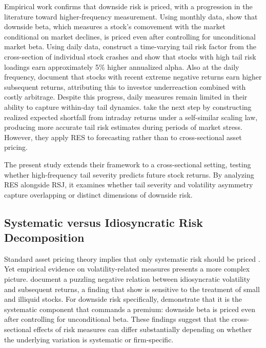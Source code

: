 \documentclass[11pt,a4paper]{article}
\begin{document}
Empirical work confirms that downside risk is priced, with a progression in the literature toward higher-frequency measurement. Using monthly data, \citet{ang2006downside} show that downside beta, which measures a stock's comovement with the market conditional on market declines, is priced even after controlling for unconditional market beta. Using daily data, \citet{kelly2014} construct a time-varying tail risk factor from the cross-section of individual stock crashes and show that stocks with high tail risk loadings earn approximately 5\% higher annualized alpha. Also at the daily frequency, \citet{atilgan2020} document that stocks with recent extreme negative returns earn higher subsequent returns, attributing this to investor underreaction combined with costly arbitrage. Despite this progress, daily measures remain limited in their ability to capture within-day tail dynamics. \citet{Dimitriadis03072022} take the next step by constructing realized expected shortfall from intraday returns under a self-similar scaling law, producing more accurate tail risk estimates during periods of market stress. However, they apply RES to forecasting rather than to cross-sectional asset pricing.

The present study extends their framework to a cross-sectional setting, testing whether high-frequency tail severity predicts future stock returns. By analyzing RES alongside RSJ, it examines whether tail severity and volatility asymmetry capture overlapping or distinct dimensions of downside risk.

\subsection{Systematic versus Idiosyncratic Risk Decomposition}

Standard asset pricing theory implies that only systematic risk should be priced \citep{sharpe1964}. Yet empirical evidence on volatility-related measures presents a more complex picture. \citet{ang2006} document a puzzling negative relation between idiosyncratic volatility and subsequent returns, a finding that \citet{bali2008} show is sensitive to the treatment of small and illiquid stocks. For downside risk specifically, \citet{ang2006downside} demonstrate that it is the systematic component that commands a premium: downside beta is priced even after controlling for unconditional beta. These findings suggest that the cross-sectional effects of risk measures can differ substantially depending on whether the underlying variation is systematic or firm-specific.
\end{document}
